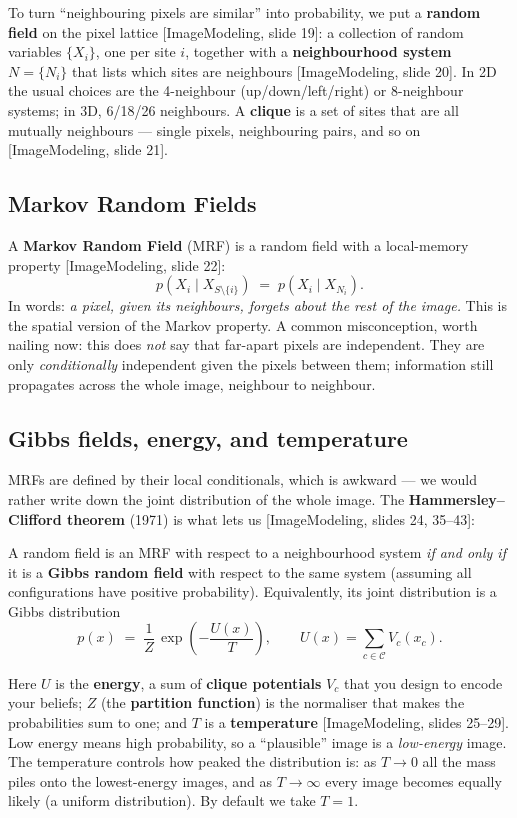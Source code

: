 \documentclass[11pt]{article}
\newcommand{\deck}[1]{\textsf{\small[#1]}}
\begin{document}
To turn ``neighbouring pixels are similar'' into probability, we put a
\textbf{random field} on the pixel lattice \deck{ImageModeling, slide 19}: a
collection of random variables $\{X_i\}$, one per site $i$, together with a
\textbf{neighbourhood system} $N=\{N_i\}$ that lists which sites are neighbours
\deck{ImageModeling, slide 20}. In 2D the usual choices are the 4-neighbour
(up/down/left/right) or 8-neighbour systems; in 3D, 6/18/26 neighbours. A
\textbf{clique} is a set of sites that are all mutually neighbours --- single
pixels, neighbouring pairs, and so on \deck{ImageModeling, slide 21}.

\subsection{Markov Random Fields}

A \textbf{Markov Random Field} (MRF) is a random field with a local-memory
property \deck{ImageModeling, slide 22}:
\[
p(X_i \mid X_{S\setminus\{i\}}) \;=\; p(X_i \mid X_{N_i}).
\]
In words: \emph{a pixel, given its neighbours, forgets about the rest of the
image.} This is the spatial version of the Markov property. A common
misconception, worth nailing now: this does \emph{not} say that far-apart pixels
are independent. They are only \emph{conditionally} independent given the
pixels between them; information still propagates across the whole image,
neighbour to neighbour.

\subsection{Gibbs fields, energy, and temperature}

MRFs are defined by their local conditionals, which is awkward --- we would
rather write down the joint distribution of the whole image. The
\textbf{Hammersley--Clifford theorem} (1971) is what lets us
\deck{ImageModeling, slides 24, 35--43}:

\begin{keybox}
A random field is an MRF with respect to a neighbourhood system \emph{if and
only if} it is a \textbf{Gibbs random field} with respect to the same system
(assuming all configurations have positive probability). Equivalently, its
joint distribution is a Gibbs distribution
\[
p(x) \;=\; \frac{1}{Z}\,\exp\!\left(-\frac{U(x)}{T}\right),
\qquad
U(x) = \sum_{c \in \mathcal{C}} V_c(x_c).
\]
\end{keybox}

Here $U$ is the \textbf{energy}, a sum of \textbf{clique potentials} $V_c$ that
you design to encode your beliefs; $Z$ (the \textbf{partition function}) is the
normaliser that makes the probabilities sum to one; and $T$ is a
\textbf{temperature} \deck{ImageModeling, slides 25--29}. Low energy means high
probability, so a ``plausible'' image is a \emph{low-energy} image. The
temperature controls how peaked the distribution is: as $T\to 0$ all the mass
piles onto the lowest-energy images, and as $T\to\infty$ every image becomes
equally likely (a uniform distribution). By default we take $T=1$.
\end{document}
